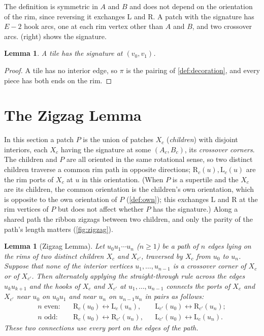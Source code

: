 \documentclass[11pt]{amsart}
\newtheorem{lemma}[theorem]{Lemma}
\theoremstyle{definition}
\theoremstyle{remark}
\newcommand{\Lp}{\mathrm L}
\newcommand{\Rp}{\mathrm R}
\begin{document}
The definition is symmetric in $A$ and $B$ and does not depend on the orientation of the rim, since reversing it
exchanges $\Lp$ and $\Rp$. A patch with the signature has $E-2$ hook arcs, one at each rim vertex other than
$A$ and $B$, and two crossover arcs.  (right) shows the signature.

\begin{lemma}\label{lem:tilesig}
A tile has the signature at $(v_0,v_1)$.
\end{lemma}

\begin{proof}
A tile has no interior edge, so $\pi$ is the pairing of \cref{def:decoration}, and every piece has both ends on the rim.
\end{proof}


\section{The Zigzag Lemma}\label{sec:reduce}
\suppressfloats[t]

In this section a patch $P$ is the union of patches $X_c$ (\emph{children}) with disjoint interiors, each $X_c$ having
the signature at some $(A_c,B_c)$, its \emph{crossover corners}. The children and $P$ are all oriented in the same
rotational sense, so two distinct children traverse a common rim path in opposite directions; $\Rp_c(u),\Lp_c(u)$ are
the rim ports of $X_c$ at $u$ in this orientation. (When $P$ is a supertile and the $X_c$ are its children, the common
orientation is the children's own orientation, which is opposite to the own orientation of $P$ (\cref{def:own}); this
exchanges $\Lp$ and $\Rp$ at the rim vertices of $P$ but does not affect whether $P$ has the signature.) Along a shared
path the ribbon zigzags between two children, and only the parity of the path's length matters (\cref{fig:zigzag}).

\begin{lemma}[Zigzag Lemma]\label{lem:zigzag}
Let $u_0u_1\cdots u_n$ ($n\ge1$) be a path of $n$ edges lying on the rims of two distinct children $X_c$ and $X_{c'}$,
traversed by $X_c$ from $u_0$ to $u_n$. Suppose that none of the interior vertices $u_1,\dots,u_{n-1}$ is a crossover
corner of $X_c$ or of $X_{c'}$. Then alternately applying the straight-through rule across the edges $u_ku_{k+1}$ and
the hooks of $X_c$ and $X_{c'}$ at $u_1,\dots,u_{n-1}$ connects the ports of $X_c$ and $X_{c'}$ near $u_0$ on $u_0u_1$
and near $u_n$ on $u_{n-1}u_n$ in pairs as follows:
\begin{align*}
n \text{ even:}\quad & \Rp_c(u_0)\leftrightarrow \Lp_c(u_n), && \Lp_{c'}(u_0)\leftrightarrow \Rp_{c'}(u_n);\\
n \text{ odd:}\quad & \Rp_c(u_0)\leftrightarrow \Rp_{c'}(u_n), && \Lp_{c'}(u_0)\leftrightarrow \Lp_c(u_n).
\end{align*}
These two connections use every port on the edges of the path.
\end{lemma}
\end{document}
